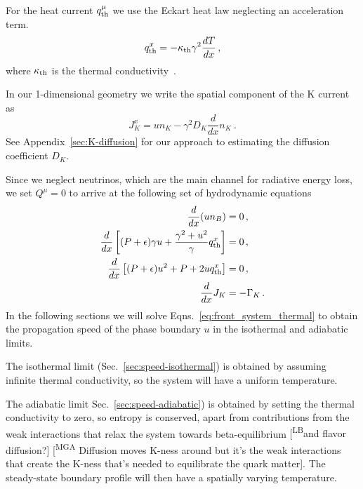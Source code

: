 \documentclass[10pt,superscriptaddress,
amsmath,aps,prc,twocolumn,nofootinbib,floatfix]{revtex4-1}
\newcommand{\mga}[1]{{\color[rgb]{0.6,0,0}#1}}
\newcommand{\mgacom}[1]{\textsf{\color[rgb]{0.8,0,0}[\textsuperscript{MGA} #1]}}
\newcommand{\LB}[1]{{\color{blue}#1}}
\newcommand{\LBcom}[1]{\textsf{\color{blue}[\textsuperscript{LB}#1]}}
\newcommand{\eps}{\epsilon}
\begin{document}
For the heat current $q^\mu_{\rm th}$ we use the Eckart heat law \LB{ neglecting an acceleration term.}~\cite{Eckart:1940te,Lopez-Monsalvo:2010oeo} 
\begin{equation}
q_{\rm th}^{x}=-\kappa_{\rm th}\gamma^2\frac{dT}{dx} \,,
\label{eq:heat_flux_main}
\end{equation}
where $\kappa_{\rm th}$ is the thermal conductivity~\cite{Heiselberg:1993cr}.

In our 1-dimensional geometry
we write the spatial component of the K current as
\begin{equation}
    J_K^x = un_K - \gamma^2 D_K\frac{d}{dx}n_K \ .
\end{equation} 
See Appendix~\ref{sec:K-diffusion} for our approach to estimating the diffusion coefficient $D_K$.

\mga{Since we neglect neutrinos, which are the main channel for radiative energy loss, we set} $Q^\mu=0$ to
arrive at the following set of hydrodynamic equations
%
\begin{subequations}\label{eq:front_system_thermal}
\begin{align}
\frac{d}{dx}(u n_B)&= 0\,, 
\label{eq:baryon_conservation_thermal}\\
\frac{d}{dx}\left[(P+\eps)\gamma u+\frac{\gamma^2+u^2}{\gamma} q_{\rm th}^x\right]&=0\,,
\label{eq:energy_conservation_thermal}\\
\frac{d}{dx}\left[(P+\eps)u^2 + P +2u q_{\rm th}^x\right]&=0\,,
\label{eq:momentum_conservation_thermal}\\
\frac{d}{dx}J_K &= -\Gamma_K\,.
\label{eq:K_conservation_thermal}
\end{align}
\end{subequations}
In the following sections we will solve 
Eqns.~\ref{eq:front_system_thermal}
to obtain the propagation speed of the phase boundary $u$ in the isothermal and adiabatic limits. 

The isothermal limit (Sec.~\ref{sec:speed-isothermal}) is obtained by assuming infinite thermal conductivity, so the system will have a uniform temperature.

The adiabatic limit Sec.~\ref{sec:speed-adiabatic}) is obtained by setting the thermal conductivity to zero, so entropy is conserved, apart from
contributions from the weak interactions that
relax the system towards beta-equilibrium \LBcom{and flavor diffusion?} \mgacom{Diffusion moves K-ness around but it's the weak interactions that create the K-ness that's needed to equilibrate the quark matter}.
The steady-state boundary profile will then have a spatially varying temperature.
\end{document}
